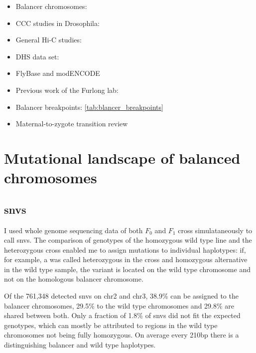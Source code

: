 \begin{itemize}
\item Balancer chromosomes: \cite{Muller1928,Oster1956,Tinderholt1960,Miller2016}
\item CCC studies in Drosophila: \cite{Sexton2012,Ghavi-Helm2014}
\item General Hi-C studies: \cite{Dixon2012}
\item DHS data set: \cite{Thomas2011}
\item FlyBase \citep{Gramates2017} and modENCODE \citep{Celniker2009}
\item Previous work of the Furlong lab: \cite{Furlong2001,Ghavi-Helm2014}
\item Balancer breakpoints: \cref{tab:blancer_breakpoints}
\item Maternal-to-zygote transition review \citep{Tadros2009}
\end{itemize}




\section{Mutational landscape of balanced chromosomes}

\subsection{\Acp{snv}}
I used whole genome sequencing data of both $F_0$ and $F_1$ cross
simulataneously to call \acp{snv}. The comparison of genotypes of the homozygous
wild type line and the heterozygous cross enabled me to assign mutations to
individual haplotypes: if, for example, a \snv was called heterozygous in the
cross and homozygous alternative in the wild type sample, the variant is located
on the wild type chromosome and not on the homologous balancer chromosome.

Of the 761,348 detected \acp{snv} on \ac{chr2} and \ac{chr3}, 38.9\% can be
assigned to the balancer chromosomes, 29.5\% to the wild type chromosomes and
29.8\% are shared between both. Only a fraction of 1.8\% of \acp{snv} did not
fit the expected genotypes, which can mostly be attributed to regions in the
wild type chromosomes not being fully homozygous.
On average every 210bp there is a \snv distinguishing balancer and wild type
haplotypes.

